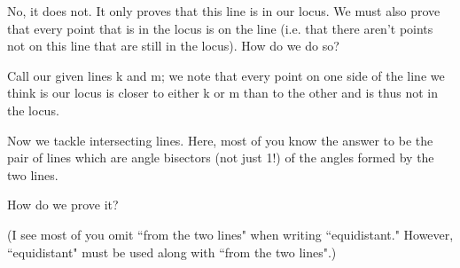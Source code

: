 No, it does not. It only proves that this line is in our locus. We must also prove that every point that is in the locus is on the line (i.e. that there aren't points not on this line that are still in the locus). How do we do so?




Call our given lines k and m; we note that every point on one side of the line we think is our locus is closer to either k or m than to the other and is thus not in the locus.

Now we tackle intersecting lines. Here, most of you know the answer to be the pair of lines which are angle bisectors (not just 1!) of the angles formed by the two lines.

How do we prove it?



\begin{remark*}
    (I see most of you omit ``from the two lines" when writing ``equidistant."
    However, ``equidistant" must be used along with ``from the two lines".)        
\end{remark*}




